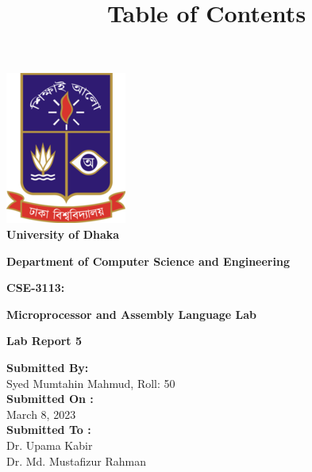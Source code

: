 \documentclass[11pt]{article}
\begin{document}
\begin{titlepage}
    \begin{center}
        \includegraphics[scale=1]{DU-log.png} \\[12pt]
        
        \Huge \textbf{University of Dhaka}
        \begin{center}
           { \LARGE \textbf{Department of Computer Science and Engineering \\[8pt]}}
           
             {\textbf{ \huge CSE-3113:\\[8pt]}}

             
             {\textbf{ \huge Microprocessor and Assembly Language Lab	 \\[8pt]}}
             
                        
             \begin{huge}
                    \textbf{ \huge Lab Report 5\\[8pt]}
                 
        		\textbf{Submitted By:\\[8pt]}
        			 Syed Mumtahin Mahmud, Roll: 50\\[8pt]
        		\textbf{Submitted On : \\[8pt]}
        			March 8, 2023\\[10pt]
        		\textbf{Submitted To :\\[8pt]}
        			Dr. Upama Kabir \\[8pt]
                        Dr. Md. Mustafizur Rahman\\[8pt]
                      
	       \end{huge}
             
        \end{center}
    \end{center}
\end{titlepage}
\begin{Large}
\title{\huge Table of Contents}

\maketitle
\hypersetup{linkcolor=black}
\tableofcontents
\end{Large}
\end{document}
